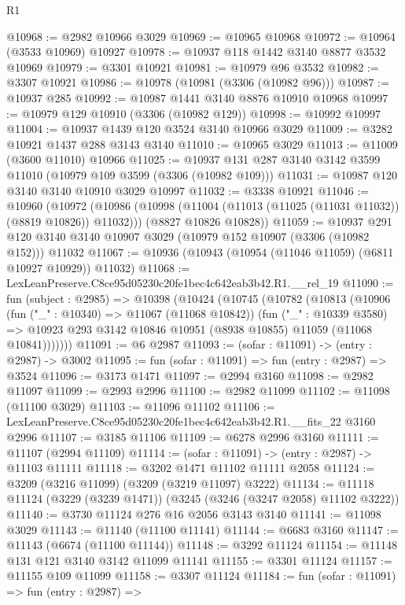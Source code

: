 \begin{lexlean}{R1}
\begin{coremodule}
@10968 := @2982 @10966 @3029
@10969 := @10965 @10968
@10972 := @10964 (@3533 @10969) @10927
@10978 := @10937 @118 @1442 @3140 @8877 @3532 @10969
@10979 := @3301 @10921
@10981 := @10979 @96 @3532
@10982 := @3307 @10921
@10986 := @10978 (@10981 (@3306 (@10982 @96)))
@10987 := @10937 @285
@10992 := @10987 @1441 @3140 @8876 @10910 @10968
@10997 := @10979 @129 @10910 (@3306 (@10982 @129))
@10998 := @10992 @10997
@11004 := @10937 @1439 @120 @3524 @3140 @10966 @3029
@11009 := @3282 @10921 @1437 @288 @3143 @3140
@11010 := @10965 @3029
@11013 := @11009 (@3600 @11010) @10966
@11025 := @10937 @131 @287 @3140 @3142 @3599 @11010 (@10979 @109 @3599 (@3306 (@10982 @109)))
@11031 := @10987 @120 @3140 @3140 @10910 @3029 @10997
@11032 := @3338 @10921
@11046 := @10960
    (@10972
      (@10986 (@10998 (@11004 (@11013 (@11025 (@11031 @11032)) (@8819 @10826)) @11032)))
      (@8827 @10826 @10828))
@11059 := @10937
    @291
    @120
    @3140
    @3140
    @10907
    @3029
    (@10979 @152 @10907 (@3306 (@10982 @152)))
    @11032
@11067 := @10936 (@10943 (@10954 (@11046 @11059) (@6811 @10927 @10929)) @11032)
@11068 := LexLeanPreserve.C8ce95d05230c20fe1bec4c642eab3b42.R1.__rel_19
@11090 := fun (subject : @2985) =>
  @10398
    (@10424
      (@10745
        (@10782
          (@10813
            (@10906
              (fun ("_" : @10340) => @11067 (@11068 @10842))
              (fun ("_" : @10339 @3580) =>
              @10923 @293 @3142 @10846 @10951 (@8938 @10855) @11059 (@11068 @10841)))))))
@11091 := @6 @2987
@11093 := (sofar : @11091) -> (entry : @2987) -> @3002
@11095 := fun (sofar : @11091) => fun (entry : @2987) => @3524
@11096 := @3173 @1471
@11097 := @2994 @3160
@11098 := @2982 @11097
@11099 := @2993 @2996
@11100 := @2982 @11099
@11102 := @11098 (@11100 @3029)
@11103 := @11096 @11102
@11106 := LexLeanPreserve.C8ce95d05230c20fe1bec4c642eab3b42.R1.__fits_22 @3160 @2996
@11107 := @3185 @11106
@11109 := @6278 @2996 @3160
@11111 := @11107 (@2994 @11109)
@11114 := (sofar : @11091) -> (entry : @2987) -> @11103 @11111
@11118 := @3202 @1471 @11102 @11111 @2058
@11124 := @3209 (@3216 @11099) (@3209 (@3219 @11097) @3222)
@11134 := @11118 @11124 (@3229 (@3239 @1471)) (@3245 (@3246 (@3247 @2058) @11102 @3222))
@11140 := @3730 @11124 @276 @16 @2056 @3143 @3140
@11141 := @11098 @3029
@11143 := @11140 (@11100 @11141)
@11144 := @6683 @3160
@11147 := @11143 (@6674 (@11100 @11144))
@11148 := @3292 @11124
@11154 := @11148 @131 @121 @3140 @3142 @11099 @11141
@11155 := @3301 @11124
@11157 := @11155 @109 @11099
@11158 := @3307 @11124
@11184 := fun (sofar : @11091) =>
  fun (entry : @2987) =>

\end{coremodule}
\end{lexlean}

